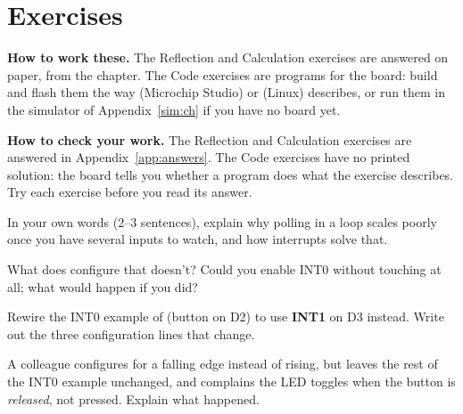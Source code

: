 
\section{Exercises}
\label{c3:sec:exercises}\label{c3:app:b}

\begin{aside}
\textbf{How to work these.} The Reflection and Calculation exercises are answered on paper, from
the chapter. The Code exercises are programs for the board: build and flash them the way
 (Microchip Studio) or  (Linux) describes, or run them in the
simulator of Appendix~\ref{sim:ch} if you have no board yet.

\textbf{How to check your work.} The Reflection and Calculation exercises are answered in
Appendix~\ref{app:answers}. The Code exercises have no printed solution: the board tells you
whether a program does what the exercise describes. Try each exercise before you read its answer.
\end{aside}

\label{c3:set:1}

\label{c3:ex:1}
In your own words (2--3 sentences), explain why polling  in a  loop
scales poorly once you have several inputs to watch, and how interrupts solve that.

\label{c3:ex:2}
What does  configure that  doesn't? Could you enable INT0 without touching
 at all; what would happen if you did?

\label{c3:set:2}

\label{c3:ex:3}
Rewire the INT0 example of  (button on D2) to use \textbf{INT1} on D3 instead.
Write out the three configuration lines that change.

\label{c3:ex:4}
A colleague configures  for a falling edge instead of rising, but leaves the rest of
the INT0 example unchanged, and complains the LED toggles when the button is \emph{released}, not
pressed. Explain what happened.

